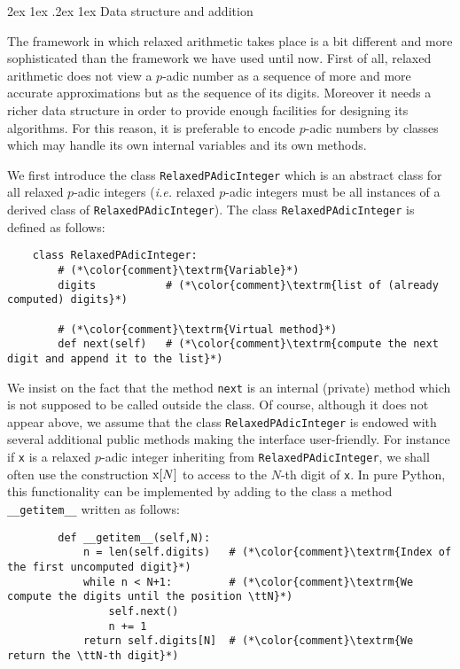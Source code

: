 \documentclass[11pt]{article}
\makeatletter
\numberwithin{equation}{section}
\numberwithin{figure}{section}
\renewcommand\paragraph{\@startsection{paragraph}{4}{\z@}%
                                    {2ex \@plus1ex \@minus.2ex}%
                                    {1ex}%
                                    {\normalfont\normalsize\bfseries}}
\theoremstyle{definition}
\newcommand{\ttx}{\texttt{\rm x}\xspace}
\newcommand{\ttN}{\texttt{\rm N}\xspace}
\makeatother
\begin{document}
\paragraph{Data structure and addition}

The framework in which relaxed arithmetic takes place is a bit different 
and more sophisticated than the framework we have used until now. First 
of all, relaxed arithmetic does not view a $p$-adic number as a sequence 
of more and more accurate approximations but as the sequence of its 
digits. Moreover it needs a richer data structure in order to provide
enough facilities for designing its algorithms. For this reason, it is
preferable to encode $p$-adic numbers by classes which may handle its own
internal variables and its own methods.

We first introduce the class \texttt{RelaxedPAdicInteger} which is an 
abstract class for all relaxed $p$-adic integers (\emph{i.e.} relaxed 
$p$-adic integers must be all instances of a derived class of 
\texttt{RelaxedPAdicInteger}). The class \texttt{RelaxedPAdicInteger} is 
defined as follows:

\begin{lstlisting}
    class RelaxedPAdicInteger:
        # (*\color{comment}\textrm{Variable}*)
        digits           # (*\color{comment}\textrm{list of (already computed) digits}*)

        # (*\color{comment}\textrm{Virtual method}*)
        def next(self)   # (*\color{comment}\textrm{compute the next digit and append it to the list}*)
\end{lstlisting}

\noindent
We insist on the fact that the method \texttt{next} is an internal
(private) method which is not supposed to be called outside the class.
Of course, although it does not appear above, we assume that the class 
\texttt{RelaxedPAdicInteger} is endowed with several additional public methods 
making the interface user-friendly. For instance if \ttx is a relaxed 
$p$-adic integer inheriting from \texttt{RelaxedPAdicInteger}, we shall often
use the construction $\ttx[N]$ to access to the $N$-th digit of \ttx.
In pure Python, this functionality can be implemented by adding to the
class a method \texttt{\_\_getitem\_\_} written as follows:

\begin{lstlisting}
        def __getitem__(self,N):
            n = len(self.digits)   # (*\color{comment}\textrm{Index of the first uncomputed digit}*)
            while n < N+1:         # (*\color{comment}\textrm{We compute the digits until the position \ttN}*)
                self.next()
                n += 1
            return self.digits[N]  # (*\color{comment}\textrm{We return the \ttN-th digit}*)
\end{lstlisting}
\end{document}

